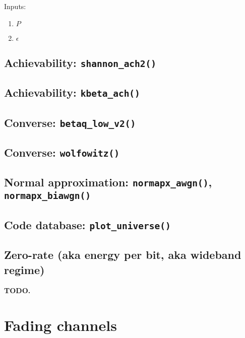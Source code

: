 \documentclass[a4paper,11p]{memoir}
\begin{document}
Inputs:
\begin{enumerate}
\item $P$
\item $\epsilon$
\end{enumerate}

\cprotect\section{Achievability: \verb|shannon_ach2()|}

\cprotect\section{Achievability: \verb|kbeta_ach()|}

\cprotect\section{Converse: \verb|betaq_low_v2()|}

\cprotect\section{Converse: \verb|wolfowitz()|}

\cprotect\section{Normal approximation: \verb|normapx_awgn()|, \verb|normapx_biawgn()|}

\cprotect\section{Code database: \verb|plot_universe()|}

\cprotect\section{Zero-rate (aka energy per bit, aka wideband regime)}
\textbf{TODO.}

\chapter{Fading channels}


\end{document}
